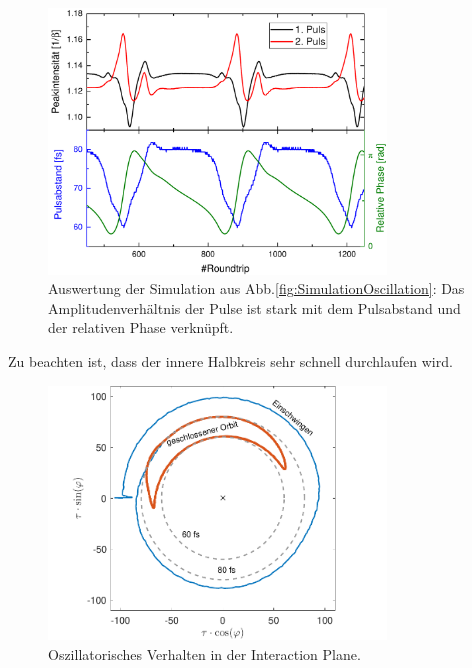 \documentclass[bachelor,       %
               twoside,        %
               BCOR10mm,       %
               liststotoc,nomtotoc,bibtotoc, %
               english,ngerman, %
               final,          %
               ]{GAUBM}
\begin{document}
\begin{figure}[!htb]
	\centering
	\includegraphics[width=0.8\textwidth]{figures/SimRBOszi}
	\caption{Auswertung der Simulation aus Abb.\ref{fig:SimulationOscillation}: Das Amplitudenverhältnis der Pulse ist stark mit dem Pulsabstand und der relativen Phase verknüpft.}
	\label{fig:SimRBOszi}
\end{figure}
Zu beachten ist, dass der innere Halbkreis sehr schnell durchlaufen wird.
\begin{figure}[!htb]
	\centering
	\includegraphics[width=0.8\textwidth]{figures/SimRB_4,6W_InteractionPlane_matlab.pdf}
	\caption{Oszillatorisches Verhalten in der Interaction Plane.}
	\label{fig:SimRBOszi_IP}
\end{figure}

\clearpage
\end{document}
